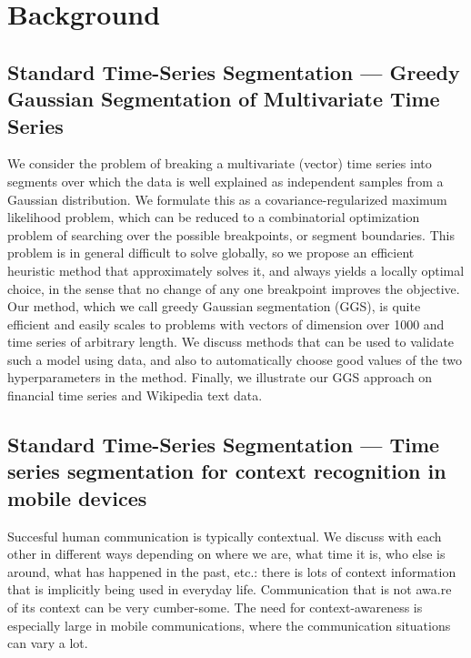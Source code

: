 \documentclass{llncs}
\begin{document}
\section{Background}
\subsection{Standard Time-Series Segmentation --- Greedy Gaussian Segmentation of Multivariate Time Series\cite{hallac2016greedy}}
We consider the problem of breaking a multivariate (vector) time series into segments over which the data is well explained as independent samples from a Gaussian distribution. We formulate this as a covariance-regularized maximum likelihood problem, which can be reduced to a combinatorial optimization problem of searching over the possible breakpoints, or segment boundaries. This problem is in general difficult to solve globally, so we propose an efficient heuristic method that approximately solves it, and always yields a locally optimal choice, in the sense that no change of any one breakpoint improves the objective. Our method, which we call greedy Gaussian segmentation (GGS), is quite efficient and easily scales to problems with vectors of dimension over 1000 and time series of arbitrary length. We discuss methods that can be used to validate such a model using data, and also to automatically choose good values of the two hyperparameters in the method. Finally, we illustrate our GGS approach on financial time series and Wikipedia text data.

\subsection{Standard Time-Series Segmentation --- Time series segmentation for context recognition in mobile devices\cite{WARRENLIAO20051857}}
Succesful human communication is typically contextual. We discuss with each other in different ways depending on where we are, what time it is, who else is around, what has happened in the past, etc.: there is lots of context information that is implicitly being used in everyday life. Communication that is not awa.re of its context can be very cumber-some. The need for context-awareness is especially large in mobile communications, where the communication situations can vary a lot.
\end{document}
